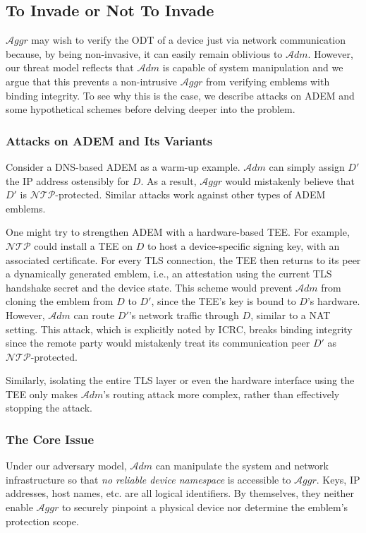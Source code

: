\documentclass[letterpaper,twocolumn,10pt]{article}
\newcommand{\T}{\ensuremath{\mathcal{A}ggr}\xspace}
\newcommand{\N}{\ensuremath{\mathcal{N\!T}\mathcal{\!P}}\xspace}
\newcommand{\ADM}{\ensuremath{\mathcal{A}dm}\xspace}
\newcommand{\dn}{\ensuremath{D}\xspace}
\newcommand{\da}{\ensuremath{D'}\xspace}
\begin{document}
\subsection{To Invade or Not To Invade}
\label{sec:main-challenge}
%
\T may wish to verify the ODT of a device just via network communication because, by being non-invasive,
it can easily remain oblivious to \ADM. However, our threat model reflects that \ADM is capable of system
manipulation and we argue that this prevents a non-intrusive \T from  verifying emblems with binding integrity.
To see why this is the case, we describe attacks on ADEM and some hypothetical schemes before delving
deeper into the problem.

\subsubsection{Attacks on ADEM and Its Variants}
Consider a DNS-based ADEM as a warm-up example. \ADM can simply assign \da the IP address ostensibly for \dn.
As a result, \T would mistakenly believe that \da is \N-protected. Similar attacks work against other
types of ADEM emblems.

One might try to strengthen ADEM with a hardware-based TEE. For example, \N could install a TEE on \dn to
host a device-specific signing key, with an associated certificate.
For every TLS connection, the TEE  then returns to its peer a dynamically generated emblem,
i.e., an attestation using the current TLS handshake secret and the device state.
This scheme would prevent \ADM from cloning the emblem from \dn to \da, since the TEE's key is bound to
\dn's hardware. However, \ADM can route \da's network traffic through \dn, similar to a NAT setting.
This attack, which is explicitly noted by ICRC, breaks binding integrity since the remote party would
mistakenly treat its communication peer \da as \N-protected.

Similarly, isolating the entire TLS layer or even the hardware interface using the TEE
only makes \ADM's routing attack more complex, rather than effectively stopping the attack.

\subsubsection{The Core Issue} Under our adversary model, \ADM can manipulate the system and network
infrastructure so that \emph{no reliable device name\-space} is accessible to \T.
Keys, IP addresses, host names, etc. are all logical identifiers. By themselves, they neither
enable \T to securely pinpoint a physical device nor determine the emblem's protection scope.
\end{document}
